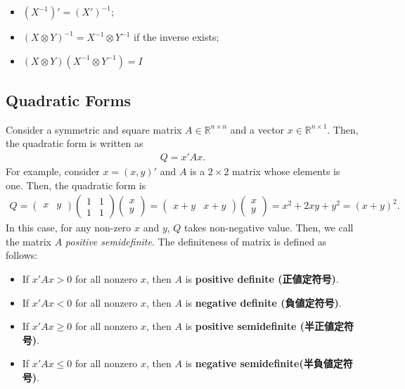 \documentclass[
  12pt,
]{article}
\providecommand{\tightlist}{%
  \setlength{\itemsep}{0pt}\setlength{\parskip}{0pt}}
\begin{document}
\begin{itemize}
\tightlist
\item
  \((X^{-1})' = (X')^{-1}\);
\item
  \((X \otimes Y)^{-1} = X^{-1} \otimes Y^{-1}\) if the inverse exists;
\item
  \((X \otimes Y)(X^{-1} \otimes Y^{-1}) = I\)
\end{itemize}

\hypertarget{quadratic-forms}{%
\subsection{Quadratic Forms}\label{quadratic-forms}}

Consider a symmetric and square matrix \(A \in \mathbb{R}^{n \times n}\)
and a vector \(x \in \mathbb{R}^{n \times 1}\). Then, the quadratic form
is written as \begin{align*}
  Q = x' A x.
\end{align*} For example, consider \(x = (x, y)'\) and \(A\) is a
\(2 \times 2\) matrix whose elements is one. Then, the quadratic form is
\begin{align*}
  Q 
  =
  \begin{pmatrix} x & y \end{pmatrix}
  \begin{pmatrix} 1 & 1 \\ 1 & 1 \end{pmatrix}
  \begin{pmatrix} x \\ y \end{pmatrix}
  =
  \begin{pmatrix} x+y & x+y \end{pmatrix}
  \begin{pmatrix} x \\ y \end{pmatrix}  
  = x^2 + 2xy + y^2 = (x + y)^2.
\end{align*} In this case, for any non-zero \(x\) and \(y\), \(Q\) takes
non-negative value. Then, we call the matrix \(A\) \emph{positive
semidefinite}. The definiteness of matrix is defined as follows:

\begin{itemize}
\tightlist
\item
  If \(x'Ax > 0\) for all nonzero \(x\), then \(A\) is \textbf{positive
  definite (正値定符号)}.
\item
  If \(x'Ax < 0\) for all nonzero \(x\), then \(A\) is \textbf{negative
  definite (負値定符号)}.
\item
  If \(x'Ax \ge 0\) for all nonzero \(x\), then \(A\) is
  \textbf{positive semidefinite (半正値定符号)}.
\item
  If \(x'Ax \le 0\) for all nonzero \(x\), then \(A\) is
  \textbf{negative semidefinite(半負値定符号)}.
\end{itemize}
\end{document}
